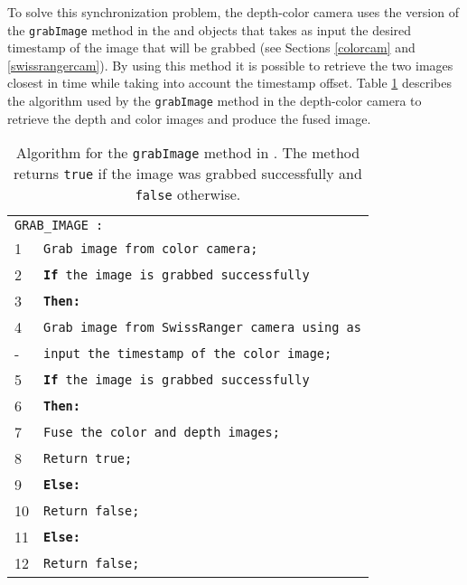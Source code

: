 To solve this synchronization problem, the depth-color camera uses the version of the \texttt{grab\-Im\-age} 
method in the \ColorCam{} and \SwissRangerCam{} objects that takes as input the desired timestamp of the 
image that will be grabbed (see Sections \ref{colorcam} and \ref{swissrangercam}). By using this method it is
possible to retrieve the two images closest in time while taking into account the timestamp offset. Table 
\ref{depthcolorgrabimage} describes the algorithm used by the \texttt{grab\-Im\-age} method in the 
depth-color camera to retrieve the depth and color images and produce the fused image.

\begin{table}[ht]
\caption[Algorithm for the \texttt{grabImage} method in \DepthColorCam{}]{Algorithm for the 
\texttt{grabImage} method in \DepthColorCam{}. The method returns \texttt{true} if the image  
was grabbed successfully and \texttt{false} otherwise.}
\begin{center}
\begin{tabular}{ l l }
\hline
\multicolumn{2}{l}{\texttt{GRAB\_IMAGE :}} \\
1 & \texttt{Grab image from color camera;} \\
2 & \texttt{{\bf If} the image is grabbed successfully} \\
3 & \hspace{0.6cm} \texttt{\bf Then:} \\
4 & \hspace{1.2cm} \texttt{Grab image from SwissRanger camera using as} \\
-  & \hspace{1.8cm} \texttt{input the timestamp of the color image;} \\
5 & \hspace{1.2cm} \texttt{{\bf If} the image is grabbed successfully} \\
6 & \hspace{1.8cm} \texttt{\bf Then:} \\
7 & \hspace{2.4cm} \texttt{Fuse the color and depth images;} \\
8 & \hspace{2.4cm} \texttt{Return true;} \\
9 & \hspace{1.8cm} \texttt{\bf Else:} \\
10 & \hspace{2.4cm} \texttt{Return false;} \\
11 & \hspace{0.6cm}\texttt{\bf Else:} \\
12 & \hspace{1.2cm} \texttt{Return false;} \\
\hline
\end{tabular}
\end{center}
\label{depthcolorgrabimage}
\end{table}

